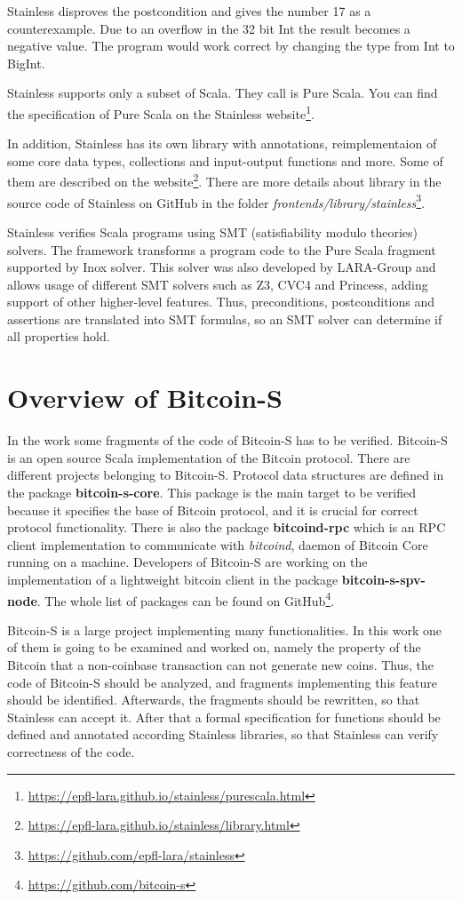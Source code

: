 Stainless disproves the postcondition and gives the number 17 as a counterexample.
Due to an overflow in the 32 bit Int the result becomes a negative value.
The program would work correct by changing the type from Int to BigInt.

Stainless supports only a subset of Scala.
They call is Pure Scala.
You can find the specification of Pure Scala on the Stainless website\footnote{\url{https://epfl-lara.github.io/stainless/purescala.html}}.

In addition, Stainless has its own library with annotations, reimplementaion of some core data types, collections and input-output functions and more.
Some of them are described on the website\footnote{\url{https://epfl-lara.github.io/stainless/library.html}}.
There are more details about library in the source code of Stainless on GitHub in the folder \textit{frontends/library/stainless}\footnote{\url{https://github.com/epfl-lara/stainless}}.

Stainless verifies Scala programs using SMT (satisfiability modulo theories) solvers. 
The framework transforms a program code to the Pure Scala fragment supported by Inox solver.
This solver was also developed by LARA-Group and allows usage of different SMT solvers such as Z3, CVC4 and Princess, adding support of other higher-level features.
Thus, preconditions, postconditions and assertions are translated into SMT formulas, so an SMT solver can determine if all properties hold.\cite{Stainless:introduction}\cite{Stainless}


\section{Overview of Bitcoin-S}
\label{sec:bitcoin_s}

In the work some fragments of the code of Bitcoin-S has to be verified.
Bitcoin-S is an open source Scala implementation of the Bitcoin protocol. 
There are different projects belonging to Bitcoin-S.
Protocol data structures are defined in the package \textbf{bitcoin-s-core}.
This package is the main target to be verified because it specifies the base of Bitcoin protocol, and it is crucial for correct protocol functionality.
There is also the package \textbf{bitcoind-rpc} which is an RPC client implementation to communicate with \textit{bitcoind}, daemon of Bitcoin Core running on a machine.
Developers of Bitcoin-S are working on the implementation of a lightweight bitcoin client in the package \textbf{bitcoin-s-spv-node}.
The whole list of packages can be found on GitHub\footnote{\url{https://github.com/bitcoin-s}}.

Bitcoin-S is a large project implementing many functionalities.
In this work one of them is going to be examined and worked on, namely the property of the Bitcoin that a non-coinbase transaction can not generate new coins.
Thus, the code of Bitcoin-S should be analyzed, and fragments implementing this feature should be identified.
Afterwards, the fragments should be rewritten, so that Stainless can accept it.
After that a formal specification for functions should be defined and annotated according Stainless libraries, so that Stainless can verify correctness of the code.


